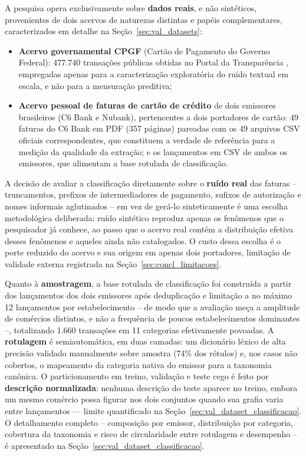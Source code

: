 A pesquisa opera exclusivamente sobre \textbf{dados reais}, e não sintéticos, provenientes de dois acervos de naturezas distintas e papéis complementares, caracterizados em detalhe na Seção~\ref{sec:val_datasets}:
\begin{itemize}
	\item \textbf{Acervo governamental CPGF} (Cartão de Pagamento do Governo Federal): 477.740 transações públicas obtidas no Portal da Transparência \cite{brasilcpgf}, empregadas apenas para a caracterização exploratória do ruído textual em escala, e não para a mensuração preditiva;
	\item \textbf{Acervo pessoal de faturas de cartão de crédito} de dois emissores brasileiros (C6 Bank e Nubank), pertencentes a dois portadores de cartão: 49 faturas do C6 Bank em PDF (357 páginas) pareadas com os 49 arquivos CSV oficiais correspondentes, que constituem a verdade de referência para a medição da qualidade da extração; e os lançamentos em CSV de ambos os emissores, que alimentam a base rotulada de classificação.
\end{itemize}

A decisão de avaliar a classificação diretamente sobre o \textbf{ruído real} das faturas -- truncamentos, prefixos de intermediadores de pagamento, sufixos de autorização e nomes informais aglutinados -- em vez de gerá-lo sinteticamente é uma escolha metodológica deliberada: ruído sintético reproduz apenas os fenômenos que o pesquisador já conhece, ao passo que o acervo real contém a distribuição efetiva desses fenômenos e aqueles ainda não catalogados. O custo dessa escolha é o porte reduzido do acervo e sua origem em apenas dois portadores, limitação de validade externa registrada na Seção~\ref{sec:concl_limitacoes}.

Quanto à \textbf{amostragem}, a base rotulada de classificação foi construída a partir dos lançamentos dos dois emissores após deduplicação e limitação a no máximo 12 lançamentos por estabelecimento -- de modo que a avaliação meça a amplitude de comércios distintos, e não a frequência de poucos estabelecimentos dominantes --, totalizando 1.660 transações em 11 categorias efetivamente povoadas. A \textbf{rotulagem} é semiautomática, em duas camadas: um dicionário léxico de alta precisão validado manualmente sobre amostra (74\% dos rótulos) e, nos casos não cobertos, o mapeamento da categoria nativa do emissor para a taxonomia canônica. O particionamento em treino, validação e teste cego é feito por \textbf{descrição normalizada}: nenhuma descrição do teste aparece no treino, embora um mesmo comércio possa figurar nos dois conjuntos quando sua grafia varia entre lançamentos --- limite quantificado na Seção~\ref{sec:val_dataset_classificacao}. O detalhamento completo -- composição por emissor, distribuição por categoria, cobertura da taxonomia e risco de circularidade entre rotulagem e desempenho -- é apresentado na Seção~\ref{sec:val_dataset_classificacao}.

